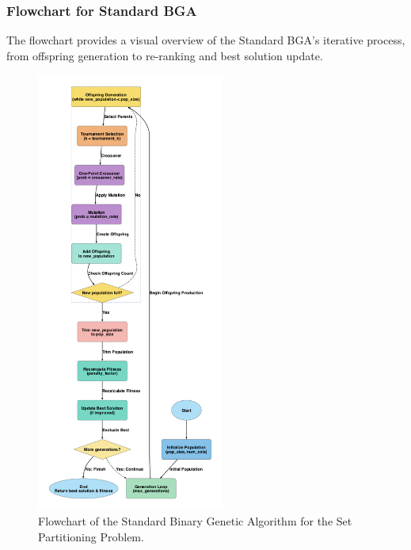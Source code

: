 \documentclass[12pt]{article}
\begin{document}
\subsubsection{Flowchart for Standard BGA}
The flowchart provides a visual overview of the Standard BGA’s iterative process, from offspring generation to re-ranking and best solution update.

\begin{figure}[htbp]
  \centering
  \includegraphics[width=0.55\textwidth]{images/standard_bga_flowchart.png}
  \caption{Flowchart of the Standard Binary Genetic Algorithm for the Set Partitioning Problem.}
  \label{fig:flowchart2}
\end{figure}

\newpage
\end{document}
